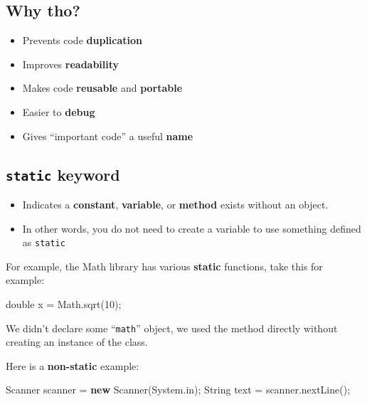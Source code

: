 \documentclass[]{article}
\newenvironment{Shaded}{}{}
\newcommand{\BuiltInTok}[1]{#1}
\newcommand{\DataTypeTok}[1]{\textcolor[rgb]{0.56,0.13,0.00}{#1}}
\newcommand{\DecValTok}[1]{\textcolor[rgb]{0.25,0.63,0.44}{#1}}
\newcommand{\FunctionTok}[1]{\textcolor[rgb]{0.02,0.16,0.49}{#1}}
\newcommand{\KeywordTok}[1]{\textcolor[rgb]{0.00,0.44,0.13}{\textbf{#1}}}
\newcommand{\NormalTok}[1]{#1}
\providecommand{\tightlist}{%
  \setlength{\itemsep}{0pt}\setlength{\parskip}{0pt}}
\begin{document}
\hypertarget{why-tho}{%
\subsection{Why tho?}\label{why-tho}}

\begin{itemize}
\item
  Prevents code \textbf{duplication}
\item
  Improves \textbf{readability}
\item
  Makes code \textbf{reusable} and \textbf{portable}
\item
  Easier to \textbf{debug}
\item
  Gives ``important code'' a useful \textbf{name}
\end{itemize}

\hypertarget{static-keyword}{%
\subsection{\texorpdfstring{\texttt{static}
keyword}{static keyword}}\label{static-keyword}}

\begin{itemize}
\tightlist
\item
  Indicates a \textbf{constant}, \textbf{variable}, or \textbf{method}
  exists without an object.
\item
  In other words, you do not need to create a variable to use something
  defined as \texttt{static}
\end{itemize}

For example, the Math library has various \textbf{static} functions,
take this for example:

\begin{Shaded}
\begin{Highlighting}[]
\DataTypeTok{double}\NormalTok{ x = }\BuiltInTok{Math}\NormalTok{.}\FunctionTok{sqrt}\NormalTok{(}\DecValTok{10}\NormalTok{);}
\end{Highlighting}
\end{Shaded}

We didn't declare some ``\texttt{math}'' object, we used the method
directly without creating an instance of the class.

Here is a \textbf{non-static} example:

\begin{Shaded}
\begin{Highlighting}[]
\BuiltInTok{Scanner}\NormalTok{ scanner = }\KeywordTok{new} \BuiltInTok{Scanner}\NormalTok{(}\BuiltInTok{System}\NormalTok{.}\FunctionTok{in}\NormalTok{);}
\BuiltInTok{String}\NormalTok{ text = scanner.}\FunctionTok{nextLine}\NormalTok{();}
\end{Highlighting}
\end{Shaded}
\end{document}
